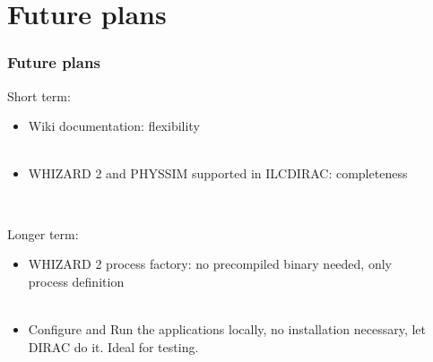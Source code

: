 \documentclass[10pt,table,dvipsnames]{beamer}
\begin{document}
\section{Future plans}
\label{sec:future}

\begin{frame}
  \frametitle{Future plans}
  \begin{block}{Short term:}
  \begin{itemize}
  \item {\color{NavyBlue}Wiki} documentation: flexibility\\~\\
  \item {\color{NavyBlue}WHIZARD 2 and PHYSSIM} supported in ILCDIRAC:
    completeness
\end{itemize}
  \end{block}
~\\
\begin{block}{Longer term:}
\begin{itemize}
  \item {\color{NavyBlue}WHIZARD 2 process factory}: no precompiled
    binary needed, only \\process definition\\~\\
  \item {\color{NavyBlue}Configure} and {\color{NavyBlue}Run the applications locally}, no installation
    necessary, let DIRAC do it. {\color{ForestGreen}Ideal for testing.}
  \end{itemize}
\end{block}
\end{frame}
\end{document}
